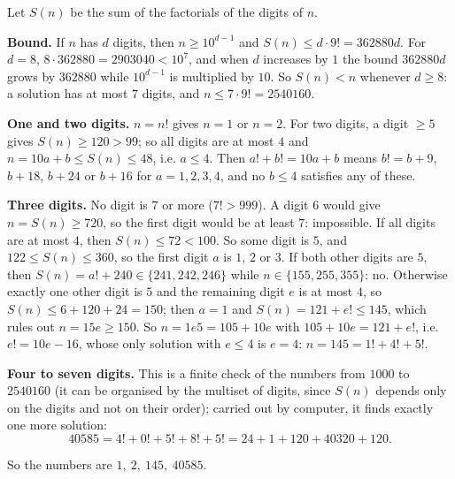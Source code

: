 Let $S(n)$ be the sum of the factorials of the digits of $n$.

\textbf{Bound.} If $n$ has $d$ digits, then $n\ge10^{d-1}$ and $S(n)\le d\cdot9!=362880d$. For $d=8$, $8\cdot362880=2903040<10^7$, and when $d$ increases by $1$ the bound $362880d$ grows by $362880$ while $10^{d-1}$ is multiplied by $10$. So $S(n)<n$ whenever $d\ge8$: a solution has at most $7$ digits, and $n\le7\cdot9!=2540160$.

\textbf{One and two digits.} $n=n!$ gives $n=1$ or $n=2$. For two digits, a digit $\ge5$ gives $S(n)\ge120>99$; so all digits are at most $4$ and $n=10a+b\le S(n)\le48$, i.e. $a\le4$. Then $a!+b!=10a+b$ means $b!=b+9$, $b+18$, $b+24$ or $b+16$ for $a=1,2,3,4$, and no $b\le4$ satisfies any of these.

\textbf{Three digits.} No digit is $7$ or more ($7!>999$). A digit $6$ would give $n=S(n)\ge720$, so the first digit would be at least $7$: impossible. If all digits are at most $4$, then $S(n)\le72<100$. So some digit is $5$, and $122\le S(n)\le360$, so the first digit $a$ is $1$, $2$ or $3$. If both other digits are $5$, then $S(n)=a!+240\in\{241,242,246\}$ while $n\in\{155,255,355\}$: no. Otherwise exactly one other digit is $5$ and the remaining digit $e$ is at most $4$, so $S(n)\le6+120+24=150$; then $a=1$ and $S(n)=121+e!\le145$, which rules out $n=15e\ge150$. So $n=1e5=105+10e$ with $105+10e=121+e!$, i.e. $e!=10e-16$, whose only solution with $e\le4$ is $e=4$: $n=145=1!+4!+5!$.

\textbf{Four to seven digits.} This is a finite check of the numbers from $1000$ to $2540160$ (it can be organised by the multiset of digits, since $S(n)$ depends only on the digits and not on their order); carried out by computer, it finds exactly one more solution:
\[40585=4!+0!+5!+8!+5!=24+1+120+40320+120.\]

So the numbers are $\boxed{1,\ 2,\ 145,\ 40585}$.
